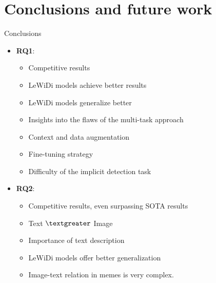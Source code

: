\section{Conclusions and future work}


\begin{frame}{Conclusions}
\begin{itemize}
    \item \textbf{RQ1}:
    \begin{itemize}
        \item Competitive results
        \item LeWiDi models achieve better results
        \item LeWiDi models generalize better
        \item Insights into the flaws of the multi-task approach
        \item Context and data augmentation
        \item Fine-tuning strategy
        \item Difficulty of the implicit detection task 
    \end{itemize} 
    \item \textbf{RQ2}:
    \begin{itemize}
        \item Competitive results, even surpassing SOTA results
        \item Text $\textgreater$ Image
        \item Importance of text description
        \item LeWiDi models offer better generalization
        \item Image-text relation in memes is very complex.
    \end{itemize}
\end{itemize}   
\end{frame}

